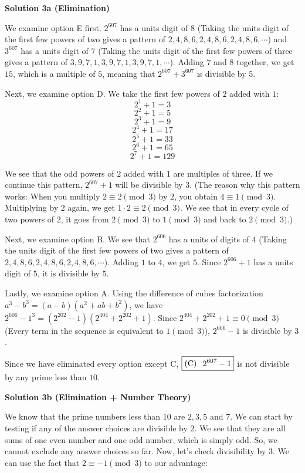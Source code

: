 \begin{enumerate}
 



\textbf{Solution 3a (Elimination)}

We examine option E first. $2^{607}$ has a units digit of $8$ (Taking the units digit of the first few powers of two gives a pattern of $2, 4, 8, 6, 2, 4, 8, 6, 2, 4, 8, 6,\cdots$) and $3^{607}$ has a units digit of $7$ (Taking the units digit of the first few powers of three gives a pattern of $3, 9, 7, 1, 3, 9, 7, 1, 3, 9, 7, 1,\cdots$). Adding $7$ and $8$ together, we get $15$, which is a multiple of $5$, meaning that $2^{607}+3^{607}$ is divisible by 5.

 Next, we examine option D. We take the first few powers of $2$ added with $1$:
 \[2^1+1=3\]
 \[2^2+1=5\]
 \[2^3+1=9\]
 \[2^4+1=17\]
 \[2^5+1=33\]
 \[2^6+1=65\]
 \[2^7+1=129\]

 We see that the odd powers of $2$ added with 1 are multiples of three. If we continue this pattern, $2^{607}+1$ will be divisible by $3$. (The reason why this pattern works: When you multiply $2 \equiv2\pmod{3}$ by $2$, you obtain $4 \equiv1 \pmod{3}$. Multiplying by $2$ again, we get $1\cdot2\equiv2 \pmod{3}$. We see that in every cycle of two powers of $2$, it goes from $2 \pmod{3}$ to $1 \pmod{3}$ and back to $2 \pmod{3}$.)

 Next, we examine option B. We see that $2^{606}$ has a units of digits of $4$ (Taking the units digit of the first few powers of two gives a pattern of $2, 4, 8, 6, 2, 4, 8, 6, 2, 4, 8, 6,\cdots$). Adding $1$ to $4$, we get $5$. Since $2^{606}+1$ has a units digit of $5$, it is divisible by $5$.

 Lastly, we examine option A. Using the difference of cubes factorization $a^3-b^3=(a-b)(a^2+ab+b^2)$, we have $2^{606}-1^3=(2^{202}-1)(2^{404}+2^{202}+1)$. Since $2^{404}+2^{202}+1\equiv0\pmod{3}$ (Every term in the sequence is equivalent to $1\pmod{3}$), $2^{606}-1$ is divisible by $3$.

 Since we have eliminated every option except C, $\boxed{\text{(C)} \hspace{0.1 in}2^{607}-1}$ is not divisible by any prime less than $10$.

 



\textbf{Solution 3b (Elimination + Number Theory)}

We know that the prime numbers less than 10 are $2,3,5$ and $7$. We can start by testing if any of the answer choices are divisible by $2$. We see that they are all sums of one even number and one odd number, which is simply odd. So, we cannot exclude any answer choices so far. Now, let's check divisibility by $3$. We can use the fact that $2 \equiv -1 \pmod{3}$ to our advantage: 


\end{enumerate}
